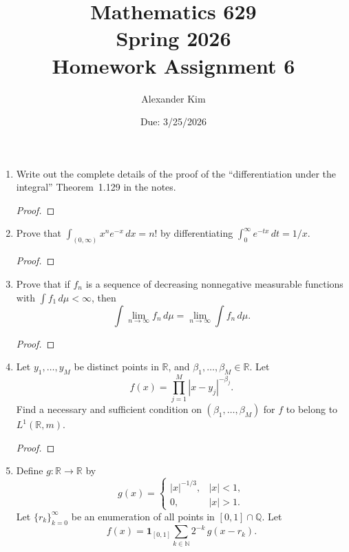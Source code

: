 \documentclass[12pt]{article}
\title{Mathematics 629\\
Spring 2026\\
Homework Assignment 6}
\author{Alexander Kim}
\date{Due: 3/25/2026}
\begin{document}
\maketitle

\begin{enumerate}

	\item Write out the complete details of the proof of the ``differentiation under the integral'' Theorem~1.129 in the notes.

	      \begin{proof}
	      \end{proof}

	\item Prove that $\int_{(0,\infty)} x^n e^{-x}\,dx = n!$ by differentiating $\int_0^\infty e^{-tx}\,dt = 1/x$.

	      \begin{proof}
	      \end{proof}

	\item Prove that if $f_n$ is a sequence of decreasing nonnegative measurable functions with $\int f_1\,d\mu < \infty$, then
	      \[
		      \int \lim_{n\to\infty} f_n\,d\mu = \lim_{n\to\infty} \int f_n\,d\mu.
	      \]

	      \begin{proof}
	      \end{proof}

	\item Let $y_1, \ldots, y_M$ be distinct points in $\mathbb{R}$, and $\beta_1, \ldots, \beta_M \in \mathbb{R}$. Let
	      \[
		      f(x) = \prod_{j=1}^{M} |x - y_j|^{-\beta_j}.
	      \]
	      Find a necessary and sufficient condition on $(\beta_1, \ldots, \beta_M)$ for $f$ to belong to $L^1(\mathbb{R}, m)$.

	      \begin{proof}
	      \end{proof}

	\item Define $g\colon \mathbb{R} \to \mathbb{R}$ by
	      \[
		      g(x) = \begin{cases} |x|^{-1/3}, & |x| < 1, \\ 0, & |x| > 1. \end{cases}
	      \]
	      Let $\{r_k\}_{k=0}^\infty$ be an enumeration of all points in $[0,1] \cap \mathbb{Q}$. Let
	      \[
		      f(x) = \mathbf{1}_{[0,1]} \sum_{k \in \mathbb{N}} 2^{-k}\, g(x - r_k).
	      \]


\end{enumerate}
\end{document}
